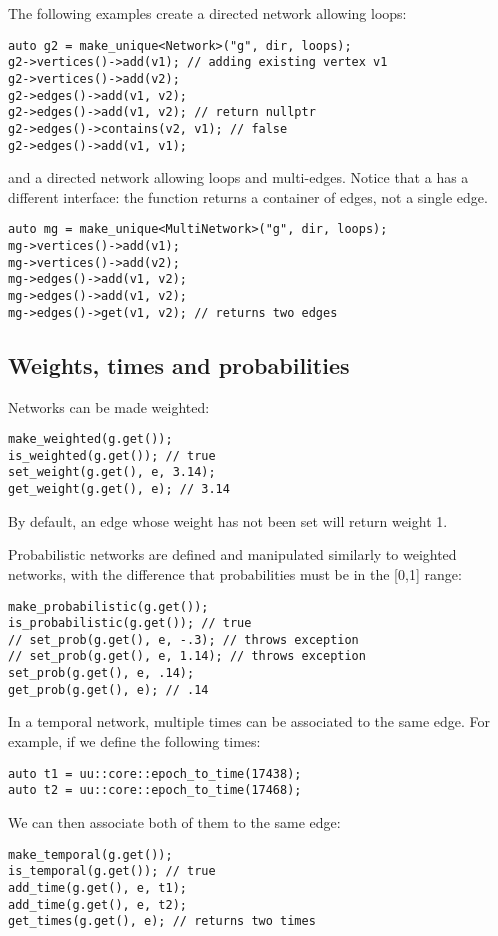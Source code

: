 The following examples create a directed network allowing loops:
\begin{lstlisting}[style=c++]
auto g2 = make_unique<Network>("g", dir, loops);
g2->vertices()->add(v1); // adding existing vertex v1
g2->vertices()->add(v2);
g2->edges()->add(v1, v2);
g2->edges()->add(v1, v2); // return nullptr
g2->edges()->contains(v2, v1); // false
g2->edges()->add(v1, v1);
\end{lstlisting}
and a directed network allowing loops and multi-edges. Notice that a  has a different interface: the function  returns a container of edges, not a single edge.
\begin{lstlisting}[style=c++]
auto mg = make_unique<MultiNetwork>("g", dir, loops);
mg->vertices()->add(v1);
mg->vertices()->add(v2);
mg->edges()->add(v1, v2);
mg->edges()->add(v1, v2);
mg->edges()->get(v1, v2); // returns two edges
\end{lstlisting}

\subsection{Weights, times and probabilities}

Networks can be made weighted:
\begin{lstlisting}[style=c++]    
make_weighted(g.get());
is_weighted(g.get()); // true
set_weight(g.get(), e, 3.14);
get_weight(g.get(), e); // 3.14
\end{lstlisting}
By default, an edge whose weight has not been set will return weight 1.

Probabilistic networks are defined and manipulated similarly to weighted networks, with the difference that probabilities must be in the [0,1] range:
\begin{lstlisting}[style=c++]
make_probabilistic(g.get());
is_probabilistic(g.get()); // true
// set_prob(g.get(), e, -.3); // throws exception
// set_prob(g.get(), e, 1.14); // throws exception
set_prob(g.get(), e, .14);
get_prob(g.get(), e); // .14
\end{lstlisting}

In a temporal network, multiple times can be associated to the same edge. For example, if we define the following times:
\begin{lstlisting}[style=c++]
auto t1 = uu::core::epoch_to_time(17438);
auto t2 = uu::core::epoch_to_time(17468);
\end{lstlisting}
We can then associate both of them to the same edge:
\begin{lstlisting}[style=c++]
make_temporal(g.get());
is_temporal(g.get()); // true
add_time(g.get(), e, t1);
add_time(g.get(), e, t2);
get_times(g.get(), e); // returns two times
\end{lstlisting}


